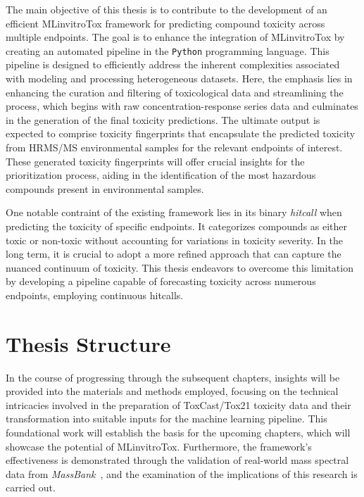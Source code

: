 The main objective of this thesis is to contribute to the development of an efficient MLinvitroTox framework for predicting compound toxicity across multiple endpoints. The goal is to enhance the integration of MLinvitroTox by creating an automated pipeline in the \texttt{Python} programming language. This pipeline is designed to efficiently address the inherent complexities associated with modeling and processing heterogeneous datasets. Here, the emphasis lies in enhancing the curation and filtering of toxicological data and streamlining the process, which begins with raw concentration-response series data and culminates in the generation of the final toxicity predictions. The ultimate output is expected to comprise toxicity fingerprints that encapsulate the predicted toxicity from HRMS/MS environmental samples for the relevant endpoints of interest. These generated toxicity fingerprints will offer crucial insights for the prioritization process, aiding in the identification of the most hazardous compounds present in environmental samples.

One notable contraint of the existing framework lies in its binary \emph{hitcall}  when predicting the toxicity of specific endpoints. It categorizes compounds as either toxic or non-toxic without accounting for variations in toxicity severity. In the long term, it is crucial to adopt a more refined approach that can capture the nuanced continuum of toxicity. This thesis endeavors to overcome this limitation by developing a pipeline capable of forecasting toxicity across numerous endpoints, employing continuous hitcalls.



\section{Thesis Structure}

In the course of progressing through the subsequent chapters, insights will be provided into the materials and methods employed, focusing on the technical intricacies involved in the preparation of ToxCast/Tox21 toxicity data and their transformation into suitable inputs for the machine learning pipeline. This foundational work will establish the basis for the upcoming chapters, which will showcase the potential of MLinvitroTox. Furthermore, the framework's effectiveness is demonstrated through the validation of real-world mass spectral data from \emph{MassBank}~\cite{massbank}, and the examination of the implications of this research is carried out.
